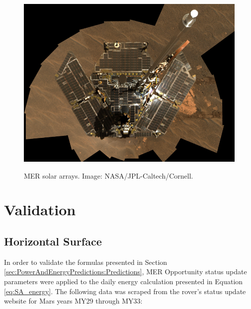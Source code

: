 \begin{figure}[h]
  \centering
  \hypersetup{linkcolor=captionTextColor}
  \includegraphics[width=0.8\linewidth]{sections/power-and-energy-predictions/images/mer-solar-arrays.png}\\
  \caption[\ac{MER} solar arrays]
          {\ac{MER} solar arrays. Image: \ac{NASA}/\ac{JPL}-Caltech/Cornell.}
  \label{fig:image:mer-solar-arrays}
\end{figure}

\clearpage
\section{Validation}
\label{sec:PowerAndEnergyPredictions:Validation}


\subsection{Horizontal Surface}
\label{sec:PowerAndEnergyPredictions:Validation:HorizontalSurface}

In order to validate the formulas presented in Section \ref{sec:PowerAndEnergyPredictions:Predictions}, \ac{MER} Opportunity status update parameters were applied to the daily energy calculation presented in Equation \ref{eq:SA_energy}. The following data was scraped from the rover's status update website for Mars years MY29 through MY33:

